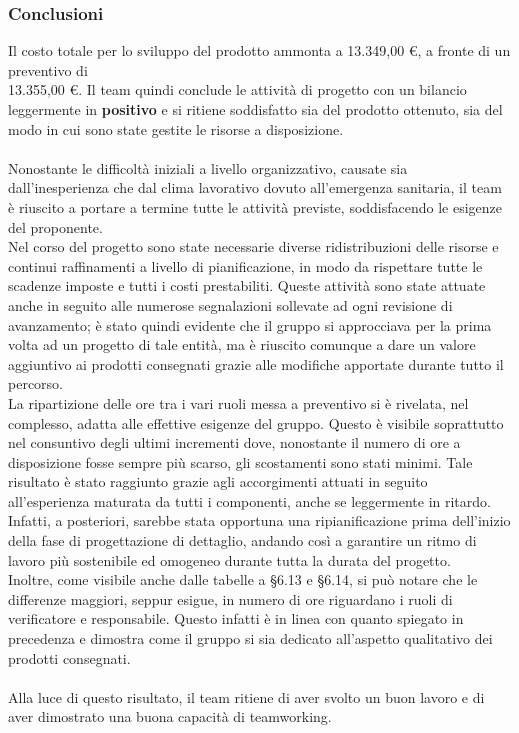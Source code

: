 \newpage


\subsubsection{Conclusioni}

Il costo totale per lo sviluppo del prodotto ammonta a 13.349,00 €, a fronte di un preventivo di \\13.355,00 €. Il team quindi conclude le attività di progetto con un bilancio leggermente in \textbf{positivo} e si ritiene soddisfatto sia del prodotto ottenuto, sia del modo in cui sono state gestite le risorse a disposizione. \\ \mbox{} \\ Nonostante le difficoltà iniziali a livello organizzativo, causate sia dall'inesperienza che dal clima lavorativo dovuto all'emergenza sanitaria, il team è riuscito a portare a termine tutte le attività previste, soddisfacendo le esigenze del proponente. \\ Nel corso del progetto sono state necessarie diverse ridistribuzioni delle risorse e continui raffinamenti a livello di pianificazione, in modo da rispettare tutte le scadenze imposte e tutti i costi prestabiliti. Queste attività sono state attuate anche in seguito alle numerose segnalazioni sollevate ad ogni revisione di avanzamento; è stato quindi evidente che il gruppo si approcciava per la prima volta ad un progetto di tale entità, ma è riuscito comunque a dare un valore aggiuntivo ai prodotti consegnati grazie alle modifiche apportate durante tutto il percorso.\\  La ripartizione delle ore tra i vari ruoli messa a preventivo si è rivelata, nel complesso, adatta alle effettive esigenze del gruppo. Questo è visibile soprattutto nel consuntivo degli ultimi incrementi dove, nonostante il numero di ore a disposizione fosse sempre più scarso, gli scostamenti sono stati minimi. Tale risultato è stato raggiunto grazie agli accorgimenti attuati in seguito all'esperienza maturata da tutti i componenti, anche se leggermente in ritardo. Infatti, a posteriori, sarebbe stata opportuna una ripianificazione prima dell'inizio della fase di progettazione di dettaglio, andando così a garantire un ritmo di lavoro più sostenibile ed omogeneo durante tutta la durata del progetto.  \\Inoltre, come visibile anche dalle tabelle a \S 6.13 e \S 6.14, si può notare che le differenze maggiori, seppur esigue, in numero di ore riguardano i ruoli di verificatore e responsabile. Questo infatti è in linea con quanto spiegato in precedenza e dimostra come il gruppo si sia dedicato all'aspetto qualitativo dei prodotti consegnati.\\ \mbox{} \\ Alla luce di questo risultato, il team ritiene di aver svolto un buon lavoro e di aver dimostrato una buona capacità di teamworking.